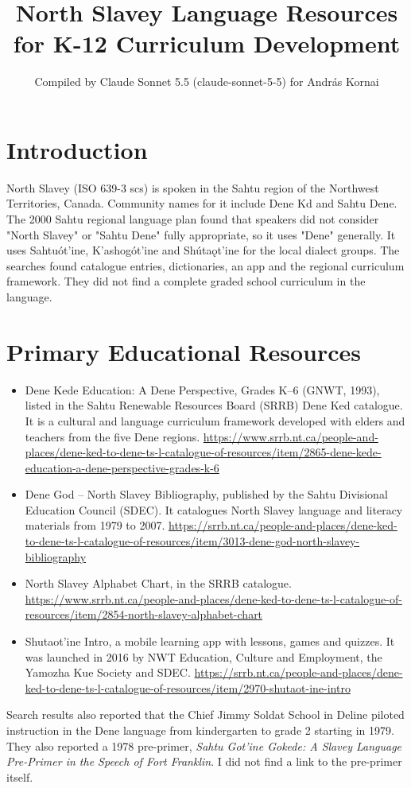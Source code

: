\documentclass[12pt]{article}
\title{North Slavey Language Resources for K-12 Curriculum Development}
\author{Compiled by Claude Sonnet 5.5 (claude-sonnet-5-5) for Andr\'as Kornai}
\date{}
\begin{document}
\maketitle

\section{Introduction}
North Slavey (ISO 639-3 scs) is spoken in the Sahtu region of the Northwest Territories, Canada. Community names for it include Dene K\textschwa d\textschwa{} and Sahtu Dene. The 2000 Sahtu regional language plan found that speakers did not consider "North Slavey" or "Sahtu Dene" fully appropriate, so it uses "Dene" generally. It uses Sahtu\'ot'ine, K'ashog\'ot'ine and Sh\'uta\k{o}t'ine for the local dialect groups. The searches found catalogue entries, dictionaries, an app and the regional curriculum framework. They did not find a complete graded school curriculum in the language.

\section{Primary Educational Resources}
\begin{itemize}
\item Dene Kede Education: A Dene Perspective, Grades K--6 (GNWT, 1993), listed in the Sahtu Renewable Resources Board (SRRB) Dene Ked\textschwa{} catalogue. It is a cultural and language curriculum framework developed with elders and teachers from the five Dene regions. \url{https://www.srrb.nt.ca/people-and-places/dene-ked-to-dene-ts-l-catalogue-of-resources/item/2865-dene-kede-education-a-dene-perspective-grades-k-6}
\item Dene God\textschwa{} -- North Slavey Bibliography, published by the Sahtu Divisional Education Council (SDEC). It catalogues North Slavey language and literacy materials from 1979 to 2007. \url{https://srrb.nt.ca/people-and-places/dene-ked-to-dene-ts-l-catalogue-of-resources/item/3013-dene-god-north-slavey-bibliography}
\item North Slavey Alphabet Chart, in the SRRB catalogue. \url{https://www.srrb.nt.ca/people-and-places/dene-ked-to-dene-ts-l-catalogue-of-resources/item/2854-north-slavey-alphabet-chart}
\item Shutaot'ine Intro, a mobile learning app with lessons, games and quizzes. It was launched in 2016 by NWT Education, Culture and Employment, the Yamozha Kue Society and SDEC. \url{https://srrb.nt.ca/people-and-places/dene-ked-to-dene-ts-l-catalogue-of-resources/item/2970-shutaot-ine-intro}
\end{itemize}
Search results also reported that the Chief Jimmy Soldat School in Deline piloted instruction in the Dene language from kindergarten to grade 2 starting in 1979. They also reported a 1978 pre-primer, \emph{Sahtu Got'ine Gokede: A Slavey Language Pre-Primer in the Speech of Fort Franklin}. I did not find a link to the pre-primer itself.
\end{document}
